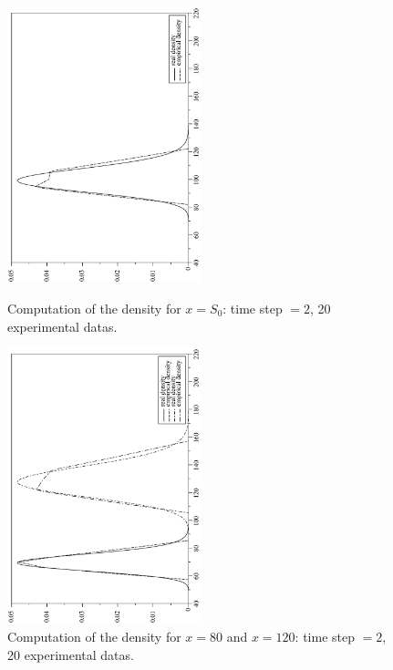 \documentclass[a4paper]{article}
\begin{document}
\begin{figure}[tbp]
\begin{center}
\includegraphics[height=8cm,angle=270]{ArticlePS/20BS2Poids.eps}
\caption{Computation of the density for $x=S_0$: time step $=2$,
20 experimental datas.\label{BS2poids}}
\includegraphics[height=8cm,angle=270]{ArticlePS/20BS2Poids2.eps}
\caption{Computation of the density for $x=80$ and $x=120$: time
step $=2$, 20 experimental datas.\label{BS2poids2}}
\end{center}
\end{figure}
\end{document}
